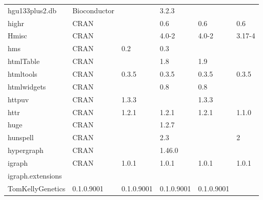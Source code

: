 \begin{longtable}{llllll}
\rowcolor{black!10}
hgu133plus2.db                & Bioconductor              &             & 3.2.3       &                &                   \\
\rowcolor{black!5}
highr                         & CRAN                      &             & 0.6         & 0.6            & 0.6                \\
\rowcolor{black!10}
Hmisc                         & CRAN                      &             & 4.0-2       & 4.0-2          & 3.17-4            \\
\rowcolor{black!5}
hms                           & CRAN                      & 0.2         & 0.3         &                &                    \\
\rowcolor{black!10}
htmlTable                     & CRAN                      &             & 1.8         & 1.9            &                   \\
\rowcolor{black!5}
htmltools                     & CRAN                      & 0.3.5       & 0.3.5       & 0.3.5          & 0.3.5              \\
\rowcolor{black!10}
htmlwidgets                   & CRAN                      &             & 0.8         & 0.8            &                   \\
\rowcolor{black!5}
httpuv                        & CRAN                      & 1.3.3       &             & 1.3.3          &                    \\
\rowcolor{black!10}
httr                          & CRAN                      & 1.2.1       & 1.2.1       & 1.2.1          & 1.1.0             \\
\rowcolor{black!5}
huge                          & CRAN                      &             & 1.2.7       &                &                    \\
\rowcolor{black!10}
hunspell                      & CRAN                      &             & 2.3         &                & 2                 \\
\rowcolor{black!5}
hypergraph                    & CRAN                      &             & 1.46.0      &                &                    \\
\rowcolor{black!10}
igraph                        & CRAN                      & 1.0.1       & 1.0.1       & 1.0.1          & 1.0.1             \\
\rowcolor{black!5}
igraph.extensions             & \begin{tabular}[c]{@{}l@{}}GitHub \\ TomKellyGenetics \end{tabular}  & 0.1.0.9001  & 0.1.0.9001  & 0.1.0.9001     & 0.1.0.9001         \\

\end{longtable}
